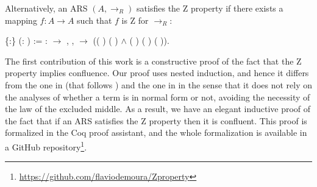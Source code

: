 \documentclass[a4paper]{article}
\begin{document}
Alternatively, an ARS $(A,\to_R)$ satisfies the Z property if there
exists a mapping $f:A \to A$ such that $f$ is Z for $\to_R$:

\begin{coqdoccode}
  \coqdocemptyline \coqdocnoindent {}
   \{:\}
  (:  ) :=
  \coqdoctac{\ensuremath{\exists}} :
  \ensuremath{\rightarrow} ,
  \coqdockw{\ensuremath{\forall}}  ,
     \ensuremath{\rightarrow}
  (( )  (
  ) \ensuremath{\land} (
  ) ( ) (
  )).\coqdoceol \coqdocemptyline
\end{coqdoccode}

The first contribution of this work is a constructive proof of the
fact that the Z property implies confluence. Our proof uses nested
induction, and hence it differs from the one in \cite{kes09} (that
follows \cite{dehornoy2008z}) and the one in \cite{zproperty} in the
sense that it does not rely on the analyses of whether a term is in
normal form or not, avoiding the necessity of the law of the excluded
middle. As a result, we have an elegant inductive proof of the fact
that if an ARS satisfies the Z property then it is confluent. This
proof is formalized in the Coq proof assistant, and the whole
formalization is available in a GitHub
repository\footnote{\label{fn:github}\url{https://github.com/flaviodemoura/Zproperty}}.
\end{document}
